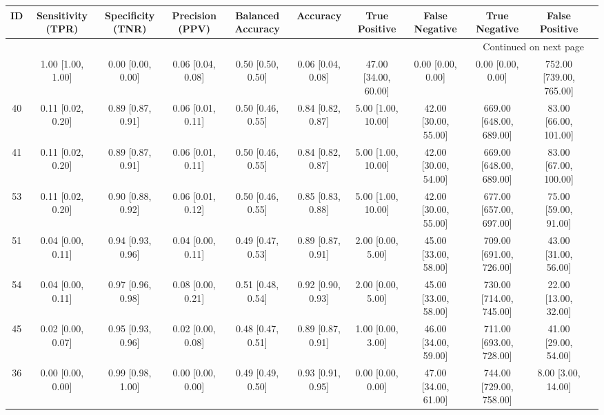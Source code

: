 \documentclass[8pt]{article}
\begin{document}
\begin{center}
\begin{footnotesize}
\begin{longtable}{|ccccccccccc|}
\toprule
 ID &  Sensitivity (TPR) &  Specificity (TNR) &    Precision (PPV) &  Balanced Accuracy &           Accuracy &         True Positive &        False Negative &            True Negative &           False Positive \\
\midrule
\endhead
\midrule
\multicolumn{10}{r}{{Continued on next page}} \\
\midrule
\endfoot

\bottomrule
\endlastfoot
 42 &  1.00 [1.00, 1.00] &  0.00 [0.00, 0.00] &  0.06 [0.04, 0.08] &  0.50 [0.50, 0.50] &  0.06 [0.04, 0.08] &  47.00 [34.00, 60.00] &     0.00 [0.00, 0.00] &        0.00 [0.00, 0.00] &  752.00 [739.00, 765.00] \\
 40 &  0.11 [0.02, 0.20] &  0.89 [0.87, 0.91] &  0.06 [0.01, 0.11] &  0.50 [0.46, 0.55] &  0.84 [0.82, 0.87] &    5.00 [1.00, 10.00] &  42.00 [30.00, 55.00] &  669.00 [648.00, 689.00] &    83.00 [66.00, 101.00] \\
 41 &  0.11 [0.02, 0.20] &  0.89 [0.87, 0.91] &  0.06 [0.01, 0.11] &  0.50 [0.46, 0.55] &  0.84 [0.82, 0.87] &    5.00 [1.00, 10.00] &  42.00 [30.00, 54.00] &  669.00 [648.00, 689.00] &    83.00 [67.00, 100.00] \\
 53 &  0.11 [0.02, 0.20] &  0.90 [0.88, 0.92] &  0.06 [0.01, 0.12] &  0.50 [0.46, 0.55] &  0.85 [0.83, 0.88] &    5.00 [1.00, 10.00] &  42.00 [30.00, 55.00] &  677.00 [657.00, 697.00] &     75.00 [59.00, 91.00] \\
 51 &  0.04 [0.00, 0.11] &  0.94 [0.93, 0.96] &  0.04 [0.00, 0.11] &  0.49 [0.47, 0.53] &  0.89 [0.87, 0.91] &     2.00 [0.00, 5.00] &  45.00 [33.00, 58.00] &  709.00 [691.00, 726.00] &     43.00 [31.00, 56.00] \\
 54 &  0.04 [0.00, 0.11] &  0.97 [0.96, 0.98] &  0.08 [0.00, 0.21] &  0.51 [0.48, 0.54] &  0.92 [0.90, 0.93] &     2.00 [0.00, 5.00] &  45.00 [33.00, 58.00] &  730.00 [714.00, 745.00] &     22.00 [13.00, 32.00] \\
 45 &  0.02 [0.00, 0.07] &  0.95 [0.93, 0.96] &  0.02 [0.00, 0.08] &  0.48 [0.47, 0.51] &  0.89 [0.87, 0.91] &     1.00 [0.00, 3.00] &  46.00 [34.00, 59.00] &  711.00 [693.00, 728.00] &     41.00 [29.00, 54.00] \\
 36 &  0.00 [0.00, 0.00] &  0.99 [0.98, 1.00] &  0.00 [0.00, 0.00] &  0.49 [0.49, 0.50] &  0.93 [0.91, 0.95] &     0.00 [0.00, 0.00] &  47.00 [34.00, 61.00] &  744.00 [729.00, 758.00] &       8.00 [3.00, 14.00] \\

\end{longtable}
\end{footnotesize}
\end{center}
\end{document}
